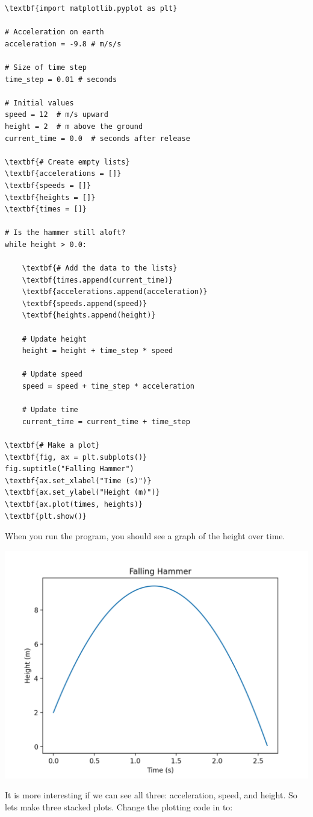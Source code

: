 \begin{Verbatim}[commandchars=\\\{\}]
\textbf{import matplotlib.pyplot as plt}

# Acceleration on earth
acceleration = -9.8 # m/s/s

# Size of time step
time_step = 0.01 # seconds

# Initial values
speed = 12  # m/s upward
height = 2  # m above the ground
current_time = 0.0  # seconds after release

\textbf{# Create empty lists}
\textbf{accelerations = []}
\textbf{speeds = []}
\textbf{heights = []}
\textbf{times = []}

# Is the hammer still aloft?
while height > 0.0:

    \textbf{# Add the data to the lists}
    \textbf{times.append(current_time)}
    \textbf{accelerations.append(acceleration)}
    \textbf{speeds.append(speed)}
    \textbf{heights.append(height)}
    
    # Update height
    height = height + time_step * speed

    # Update speed
    speed = speed + time_step * acceleration

    # Update time
    current_time = current_time + time_step

\textbf{# Make a plot}
\textbf{fig, ax = plt.subplots()}
fig.suptitle("Falling Hammer")
\textbf{ax.set_xlabel("Time (s)")}
\textbf{ax.set_ylabel("Height (m)")}
\textbf{ax.plot(times, heights)}
\textbf{plt.show()}
\end{Verbatim}

When you run the program, you should see a graph of the height over time.

\includegraphics[width=0.7\linewidth]{heightplot.png}

It is more interesting if we can see all three: acceleration, speed, and height. 
So lets make three stacked plots.  Change the plotting code in  to:

